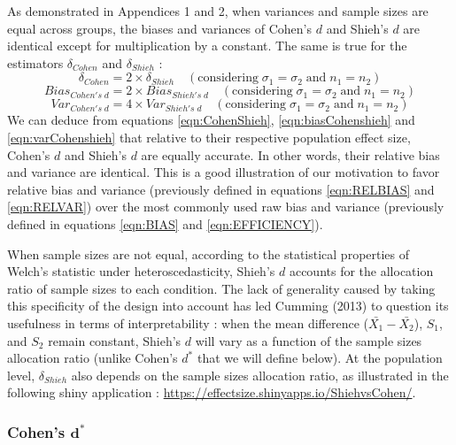 \documentclass[
  english,
  man,floatsintext]{apa6}
\begin{document}
As demonstrated in Appendices 1 and 2, when variances and sample sizes are equal across groups, the biases and variances of Cohen's \(d\) and Shieh's \(d\) are identical except for multiplication by a constant. The same is true for the estimators \(\delta_{Cohen}\) and \(\delta_{Shieh}\) :\\
\begin{equation} 
\delta_{Cohen} = 2 \times \delta_{Shieh} \quad (\mbox{considering} \; \sigma_1 = \sigma_2 \; \mbox{and} \; n_1 = n_2)
\label{eqn:CohenShieh}
\end{equation}
\begin{equation} 
Bias_{Cohen's \; d} = 2 \times Bias_{Shieh's \; d} \quad (\mbox{considering} \; \sigma_1 = \sigma_2 \; \mbox{and} \; n_1 = n_2)
\label{eqn:biasCohenshieh}
\end{equation}
\begin{equation} 
Var_{Cohen's \; d} = 4 \times Var_{Shieh's \; d} \quad (\mbox{considering}\; \sigma_1 = \sigma_2 \; \mbox{and} \; n_1 = n_2)
\label{eqn:varCohenshieh}
\end{equation}
We can deduce from equations \ref{eqn:CohenShieh}, \ref{eqn:biasCohenshieh} and \ref{eqn:varCohenshieh} that relative to their respective population effect size, Cohen's \(d\) and Shieh's \(d\) are equally accurate. In other words, their relative bias and variance are identical. This is a good illustration of our motivation to favor relative bias and variance (previously defined in equations \ref{eqn:RELBIAS} and \ref{eqn:RELVAR}) over the most commonly used raw bias and variance (previously defined in equations \ref{eqn:BIAS} and \ref{eqn:EFFICIENCY}).

When sample sizes are not equal, according to the statistical properties of Welch's statistic under heteroscedasticity, Shieh's \(d\) accounts for the allocation ratio of sample sizes to each condition. The lack of generality caused by taking this specificity of the design into account has led Cumming (2013) to question its usefulness in terms of interpretability : when the mean difference (\(\bar{X_1}-\bar{X_2}\)), \(S_1\), and \(S_2\) remain constant, Shieh's \(d\) will vary as a function of the sample sizes allocation ratio (unlike Cohen's \(d^*\) that we will define below). At the population level, \(\delta_{Shieh}\) also depends on the sample sizes allocation ratio, as illustrated in the following shiny application : \url{https://effectsize.shinyapps.io/ShiehvsCohen/}.

\hypertarget{cohens-bmd}{%
\subsubsection{\texorpdfstring{Cohen's \(\bm{d^*}\)}{Cohen's \textbackslash bm\{d\^{}*\}}}\label{cohens-bmd}}
\end{document}
